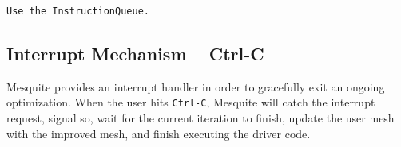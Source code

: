 \begin{verbatim}
Use the InstructionQueue. 
\end{verbatim}

\subsection{Interrupt Mechanism -- Ctrl-C} \label{sec:Ctrl-C}

Mesquite provides an interrupt handler in order to gracefully exit an ongoing optimization. When
the user hits \texttt{Ctrl-C}, Mesquite will catch the interrupt request, signal so, wait for the
current iteration to finish, update the user mesh with the improved mesh, and finish executing the
driver code.  
